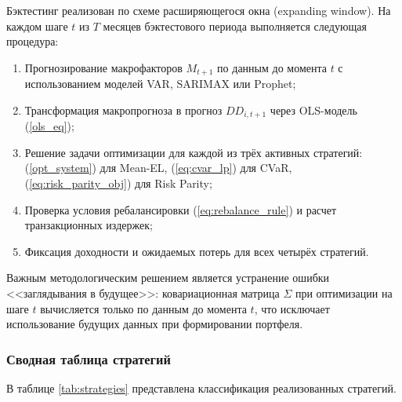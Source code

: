 \documentclass[]{article}
\begin{document}
	Бэктестинг реализован по схеме расширяющегося окна (expanding window). На каждом шаге $t$ из
	$T$ месяцев бэктестового периода выполняется следующая процедура:
	\begin{enumerate}
		\item Прогнозирование макрофакторов $M_{t+1}$ по данным до момента $t$ с использованием
		моделей VAR, SARIMAX или Prophet;
		\item Трансформация макропрогноза в прогноз $DD_{i, t+1}$ через OLS-модель (\ref{ols_eq});
		\item Решение задачи оптимизации для каждой из трёх активных стратегий:
		(\ref{opt_system}) для Mean-EL, (\ref{eq:cvar_lp}) для CVaR, (\ref{eq:risk_parity_obj}) для Risk Parity;
		\item Проверка условия ребалансировки (\ref{eq:rebalance_rule}) и расчет транзакционных издержек;
		\item Фиксация доходности и ожидаемых потерь для всех четырёх стратегий.
	\end{enumerate}
	Важным методологическим решением является устранение ошибки <<заглядывания в будущее>>:
	ковариационная матрица $\Sigma$ при оптимизации на шаге $t$ вычисляется только по данным до момента $t$,
	что исключает использование будущих данных при формировании портфеля.

	\subsubsection{Сводная таблица стратегий}

	В таблице \ref{tab:strategies} представлена классификация реализованных стратегий.
\end{document}
